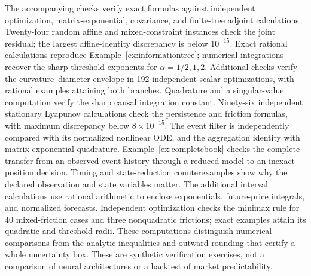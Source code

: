 \documentclass[11pt]{article}
\theoremstyle{plain}
\theoremstyle{definition}
\theoremstyle{remark}
\begin{document}
The accompanying checks verify exact formulas against independent
optimization, matrix-exponential, covariance, and finite-tree adjoint
calculations. Twenty-four random affine and mixed-constraint instances
check the joint residual; the largest affine-identity discrepancy is
below \(10^{-15}\). Exact rational calculations reproduce
Example~\ref{ex:informationtree}; numerical integrations recover the
sharp threshold exponents for \(\alpha=1/2,1,2\).
Additional checks verify the curvature--diameter envelope in 192
independent scalar optimizations, with rational examples attaining both
branches. Quadrature and a singular-value computation verify the sharp
causal integration constant. Ninety-six independent stationary
Lyapunov calculations check the persistence and friction formulas,
with maximum discrepancy below \(8\times10^{-15}\).
The event filter is independently compared with its normalized
nonlinear ODE, and the aggregation identity with matrix-exponential
quadrature. Example~\ref{ex:completebook} checks the complete transfer
from an observed event history through a reduced model to an
inexact position decision. Timing and state-reduction counterexamples
show why the declared observation and state variables matter.
The additional interval calculations use rational arithmetic to
enclose exponentials, future-price integrals, and normalized
forecasts. Independent optimization checks the minimax rule for
40 mixed-friction cases and three nonquadratic frictions;
exact examples attain its quadratic and threshold radii.
These computations distinguish numerical comparisons from the
analytic inequalities and outward rounding that certify a whole
uncertainty box.
These are synthetic verification exercises, not a comparison of neural
architectures or a backtest of market predictability.



\end{document}
